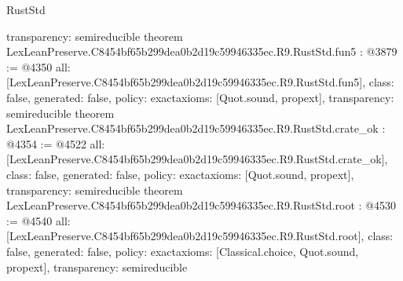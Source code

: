\begin{lexlean}{RustStd}
\begin{coremodule}
{  transparency: semireducible
}
theorem LexLeanPreserve.C8454bf65b299dea0b2d19c59946335ec.R9.RustStd.fun5 : @3879 := @4350 {
  all: [LexLeanPreserve.C8454bf65b299dea0b2d19c59946335ec.R9.RustStd.fun5],
  class: false,
  generated: false,
  policy: exact{axioms: [Quot.sound, propext]},
  transparency: semireducible
}
theorem LexLeanPreserve.C8454bf65b299dea0b2d19c59946335ec.R9.RustStd.crate_ok : @4354 := @4522 {
  all: [LexLeanPreserve.C8454bf65b299dea0b2d19c59946335ec.R9.RustStd.crate_ok],
  class: false,
  generated: false,
  policy: exact{axioms: [Quot.sound, propext]},
  transparency: semireducible
}
theorem LexLeanPreserve.C8454bf65b299dea0b2d19c59946335ec.R9.RustStd.root : @4530 := @4540 {
  all: [LexLeanPreserve.C8454bf65b299dea0b2d19c59946335ec.R9.RustStd.root],
  class: false,
  generated: false,
  policy: exact{axioms: [Classical.choice, Quot.sound, propext]},
  transparency: semireducible
}


\end{coremodule}
\end{lexlean}
